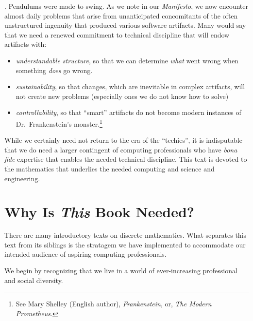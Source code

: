 .
Pendulums were made to swing.  As we note in our {\it Manifesto}, we now encounter almost daily problems that arise from unanticipated concomitants of the often unstructured ingenuity that produced various software artifacts.  Many would say that we need a renewed commitment to technical discipline that will endow artifacts with:
\begin{itemize}
\item
{\em understandable structure}, so that we can determine {\em what} went wrong when something {\em does} go wrong.
\item
{\em sustainability}, so that changes, which are inevitable in complex artifacts, will not create new problems (especially ones we do not know how to solve)
\item
{\em controllability}, so that ``smart'' artifacts do not become modern instances of Dr.~Frankenstein's monster.\footnote{See Mary Shelley (English author), {\it Frankenstein}, or, {\it The Modern Prometheus}.}
\end{itemize}
While we certainly need not return to the era of the ``techies'', it is indisputable that we do need a larger contingent of computing professionals who have {\em bona fide} expertise that enables the needed technical discipline.  This text is devoted to the mathematics that underlies the needed computing and science and engineering.


\section{Why Is {\em This} Book Needed?}
\label{sec:thisbookneed}

There are many introductory texts on discrete mathematics.  What separates this text from its siblings is the stratagem we have implemented to accommodate our intended audience of aspiring computing professionals.

\smallskip

We begin by recognizing that we live in a world of ever-increasing professional and social diversity.

\medskip

